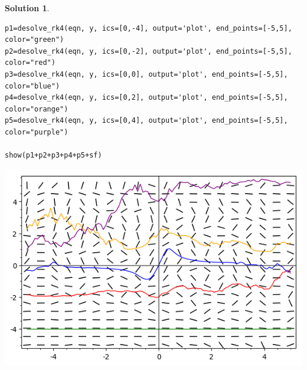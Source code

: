 \documentclass[10pt]{article}
\makeatletter
\theoremstyle{definition}
\newtheorem{soln}{Solution}
\newcommand{\boxspacing}{\kern\kvtcb@left@rule\kern\kvtcb@boxsep}
\newcommand{\prompt}[4]{
    \ttfamily\llap{{\color{#2}[#3]:\hspace{3pt}#4}}\vspace{-\baselineskip}
}
\makeatother
\begin{document}
\begin{soln}
\begin{enumerate}[label=(\alph*)]
\begin{tcolorbox}[breakable, size=fbox, boxrule=1pt, pad at break*=1mm,colback=cellbackground, colframe=cellborder]
\begin{verbatim}
p1=desolve_rk4(eqn, y, ics=[0,-4], output='plot', end_points=[-5,5], color="green")
p2=desolve_rk4(eqn, y, ics=[0,-2], output='plot', end_points=[-5,5], color="red")
p3=desolve_rk4(eqn, y, ics=[0,0], output='plot', end_points=[-5,5], color="blue")
p4=desolve_rk4(eqn, y, ics=[0,2], output='plot', end_points=[-5,5], color="orange")
p5=desolve_rk4(eqn, y, ics=[0,4], output='plot', end_points=[-5,5], color="purple")

show(p1+p2+p3+p4+p5+sf)
                      \end{verbatim}
          \end{tcolorbox}
          \begin{tcolorbox}[breakable, size=fbox, boxrule=.5pt, pad at break*=1mm, opacityfill=0]
            \prompt{Out}{outcolor}{1}{\boxspacing}
            \includegraphics[scale=0.75]{G3.png} \\
          \end{tcolorbox}
  \end{enumerate}
\end{soln}
\end{document}
